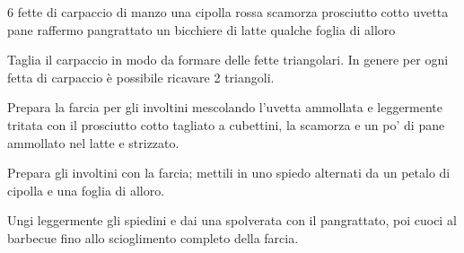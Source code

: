 \begin{ingreds}
	6 fette di carpaccio di manzo
	una cipolla rossa
	scamorza
	prosciutto cotto 
	uvetta
	pane raffermo
	pangrattato
	un bicchiere di latte
	qualche foglia di alloro
\end{ingreds}

\begin{method}
Taglia il carpaccio in modo da formare delle fette triangolari. In genere per ogni fetta di carpaccio è possibile ricavare 2 triangoli.

Prepara la farcia per gli involtini mescolando l'uvetta ammollata e leggermente tritata con il prosciutto cotto tagliato a cubettini, la scamorza e un po' di pane ammollato nel latte e strizzato.

Prepara gli involtini con la farcia; mettili in uno spiedo alternati da un petalo di cipolla e una foglia di alloro.

Ungi leggermente gli  spiedini e dai una spolverata con il pangrattato, poi cuoci al barbecue fino allo scioglimento completo della farcia.

\end {method}


